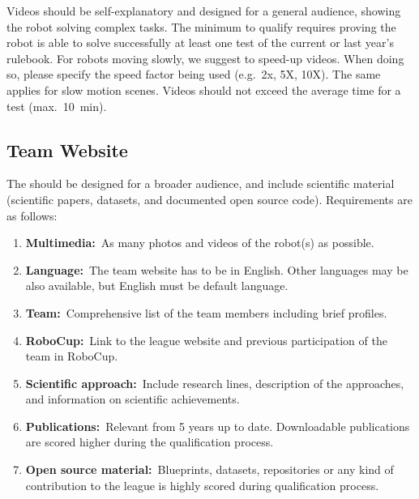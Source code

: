 Videos should be self-explanatory and designed for a general audience, showing the  robot solving complex tasks. The minimum to qualify requires proving the robot is able to solve successfully at least one test of the current or last year's rulebook. For robots moving slowly, we suggest to speed-up videos. When doing so, please specify the speed factor being used (e.g.~2x, 5X, 10X). The same applies for slow motion scenes. Videos should not exceed the average time for a test (max.~\SI{10}{\minute}).

\subsection{Team Website}

The  should be designed for a broader audience, and include scientific material (scientific papers, datasets, and documented open source code). Requirements are as follows:

\begin{enumerate}

	\item \textbf{Multimedia:}~As many photos and videos of the robot(s) as possible.

	\item \textbf{Language:}~The team website has to be in English. Other languages may be also available, but English must be default language.

	\item \textbf{Team:}~Comprehensive list of the team members including brief profiles.

	\item \textbf{RoboCup:}~Link to the league website and previous participation of the team in RoboCup.

	\item \textbf{Scientific approach:}~Include research lines, description of the approaches, and information on scientific achievements.

	\item \textbf{Publications:}~Relevant  from 5 years up to date. Downloadable publications are scored higher during the qualification process.

	\item \textbf{Open source material:}~Blueprints, datasets, repositories or any kind of contribution to the league is highly scored during qualification process.
\end{enumerate}


